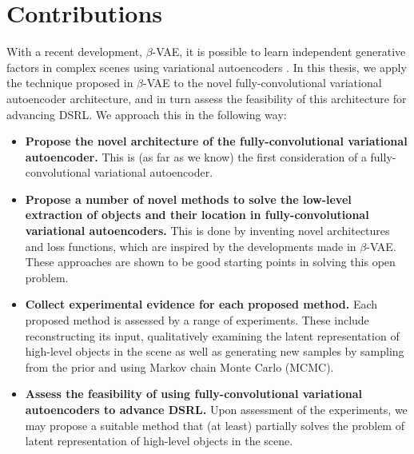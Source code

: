 \section{Contributions}

With a recent development, $\beta$-VAE, it is possible to learn independent generative factors in complex scenes using variational autoencoders \cite{Higgins2016}. In this thesis, we apply the technique proposed in $\beta$-VAE to the novel fully-convolutional variational autoencoder architecture, and in turn assess the feasibility of this architecture for advancing DSRL. We approach this in the following way:
\begin{itemize}
\item \textbf{Propose the novel architecture of the fully-convolutional variational autoencoder.} This is (as far as we know) the first consideration of a fully-convolutional variational autoencoder.
\item \textbf{Propose a number of novel methods to solve the low-level extraction of objects and their location in fully-convolutional variational autoencoders.} This is done by inventing novel architectures and loss functions, which are inspired by the developments made in $\beta$-VAE. These approaches are shown to be good starting points in solving this open problem.
\item \textbf{Collect experimental evidence for each proposed method.} Each proposed method is assessed by a range of experiments. These include reconstructing its input, qualitatively examining the latent representation of high-level objects in the scene as well as generating new samples by sampling from the prior and using Markov chain Monte Carlo (MCMC).
\item \textbf{Assess the feasibility of using fully-convolutional variational autoencoders to advance DSRL.} Upon assessment of the experiments, we may propose a suitable method that (at least) partially solves the problem of latent representation of high-level objects in the scene.
\end{itemize}